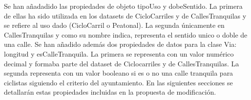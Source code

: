 Se han añadadido las propiedades de objeto tipoUso y dobeSentido. La primera de ellas ha sido utilizada en los datasets de CicloCarriles y de CallesTranquilas y se refiere al uso dado (CicloCarril o Peatonal). La segunda únicamente en CallesTranquilas y como su nombre indica, representa el sentido unico o doble de una calle.\newline
Se han añadido además dos propiedades de datos para la clase Via: longitud y esCalleTranquila. La primera se representa con un valor numérico decimal y formaba parte del dataset de Ciclocarriles y de CallesTranquilas. La segunda representa con un valor booleano si es o no una calle tranquila para ciclistas siguiendo el criterio del ayuntamiento.\newline
En las siguientes secciones se detallarán estas propiedades incluidas en la propuesta de modificación.


